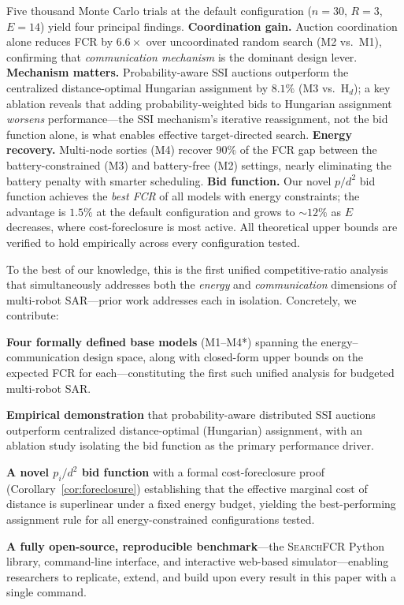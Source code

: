 \documentclass[conference]{IEEEtran}
\begin{document}
Five thousand Monte Carlo trials at the default configuration ($n{=}30$,
$R{=}3$, $E{=}14$) yield four principal findings.
\textbf{Coordination gain.}
Auction coordination alone reduces FCR by $6.6\times$ over uncoordinated random
search (M2 vs.\ M1), confirming that \emph{communication mechanism} is the
dominant design lever.
\textbf{Mechanism matters.}
Probability-aware SSI auctions outperform the centralized distance-optimal
Hungarian assignment by $8.1\%$ (M3 vs.\ $\mathrm{H}_d$); a key ablation reveals
that adding probability-weighted bids to Hungarian assignment \emph{worsens}
performance---the SSI mechanism's iterative reassignment, not the bid function
alone, is what enables effective target-directed search.
\textbf{Energy recovery.}
Multi-node sorties (M4) recover $90\%$ of the FCR gap between the
battery-constrained (M3) and battery-free (M2) settings, nearly eliminating the
battery penalty with smarter scheduling.
\textbf{Bid function.}
Our novel $p/d^2$ bid function achieves the \emph{best FCR} of all models with
energy constraints; the advantage is $1.5\%$ at the default configuration and
grows to ${\sim}12\%$ as $E$ decreases, where cost-foreclosure is most active.
All theoretical upper bounds are verified to hold empirically across
every configuration tested.

To the best of our knowledge, this is the first unified competitive-ratio
analysis that simultaneously addresses both the \emph{energy} and
\emph{communication} dimensions of multi-robot SAR---prior work addresses
each in isolation.
Concretely, we contribute:

\textbf{Four formally defined base models} (M1--M4*) spanning the
energy--communication design space, along with closed-form upper bounds on
the expected FCR for each---constituting the first such unified analysis
for budgeted multi-robot SAR.

\textbf{Empirical demonstration} that probability-aware distributed
SSI auctions outperform centralized distance-optimal (Hungarian) assignment,
with an ablation study isolating the bid function as the primary performance
driver.

\textbf{A novel $p_i/d^2$ bid function} with a formal cost-foreclosure
proof (Corollary~\ref{cor:foreclosure}) establishing that the effective
marginal cost of distance is superlinear under a fixed energy budget,
yielding the best-performing assignment rule for all energy-constrained
configurations tested.

\textbf{A fully open-source, reproducible benchmark}---the
\textsc{SearchFCR} Python library, command-line interface, and interactive
web-based simulator---enabling researchers to replicate, extend, and
build upon every result in this paper with a single command.
\end{document}
